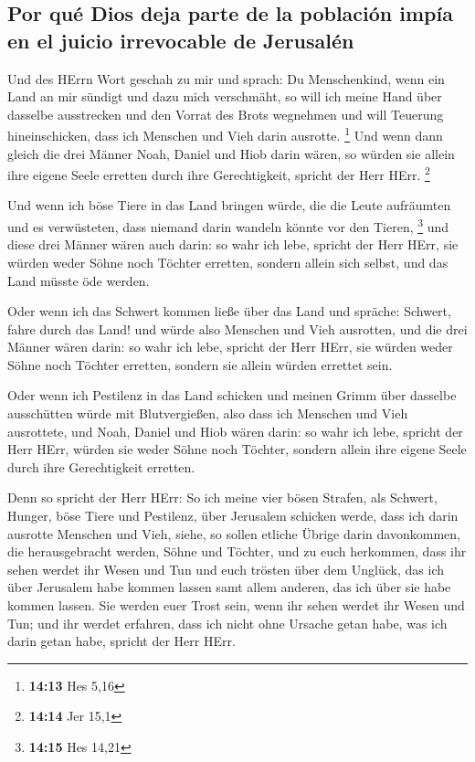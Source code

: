 \hypertarget{por-quuxe9-dios-deja-parte-de-la-poblaciuxf3n-impuxeda-en-el-juicio-irrevocable-de-jerusaluxe9n}{%
\subsection{Por qué Dios deja parte de la población impía en el juicio
irrevocable de
Jerusalén}\label{por-quuxe9-dios-deja-parte-de-la-poblaciuxf3n-impuxeda-en-el-juicio-irrevocable-de-jerusaluxe9n}}

 Und des HErrn Wort geschah zu mir und sprach:
 Du Menschenkind, wenn ein Land an mir sündigt und dazu
mich verschmäht, so will ich meine Hand über dasselbe ausstrecken und
den Vorrat des Brots wegnehmen und will Teuerung hineinschicken, dass
ich Menschen und Vieh darin ausrotte. \footnote{\textbf{14:13} Hes 5,16}
 Und wenn dann gleich die drei Männer Noah, Daniel und
Hiob darin wären, so würden sie allein ihre eigene Seele erretten durch
ihre Gerechtigkeit, spricht der Herr HErr. \footnote{\textbf{14:14} Jer
  15,1}

 Und wenn ich böse Tiere in das Land bringen würde, die
die Leute aufräumten und es verwüsteten, dass niemand darin wandeln
könnte vor den Tieren, \footnote{\textbf{14:15} Hes 14,21}
 und diese drei Männer wären auch darin: so wahr ich
lebe, spricht der Herr HErr, sie würden weder Söhne noch Töchter
erretten, sondern allein sich selbst, und das Land müsste öde werden.

 Oder wenn ich das Schwert kommen ließe über das Land und
spräche: Schwert, fahre durch das Land! und würde also Menschen und Vieh
ausrotten,  und die drei Männer wären darin: so wahr ich
lebe, spricht der Herr HErr, sie würden weder Söhne noch Töchter
erretten, sondern sie allein würden errettet sein.

 Oder wenn ich Pestilenz in das Land schicken und meinen
Grimm über dasselbe ausschütten würde mit Blutvergießen, also dass ich
Menschen und Vieh ausrottete,  und Noah, Daniel und Hiob
wären darin: so wahr ich lebe, spricht der Herr HErr, würden sie weder
Söhne noch Töchter, sondern allein ihre eigene Seele durch ihre
Gerechtigkeit erretten.

 Denn so spricht der Herr HErr: So ich meine vier bösen
Strafen, als Schwert, Hunger, böse Tiere und Pestilenz, über Jerusalem
schicken werde, dass ich darin ausrotte Menschen und Vieh,
 siehe, so sollen etliche Übrige darin davonkommen, die
herausgebracht werden, Söhne und Töchter, und zu euch herkommen, dass
ihr sehen werdet ihr Wesen und Tun und euch trösten über dem Unglück,
das ich über Jerusalem habe kommen lassen samt allem anderen, das ich
über sie habe kommen lassen.  Sie werden euer Trost sein,
wenn ihr sehen werdet ihr Wesen und Tun; und ihr werdet erfahren, dass
ich nicht ohne Ursache getan habe, was ich darin getan habe, spricht der
Herr HErr.

